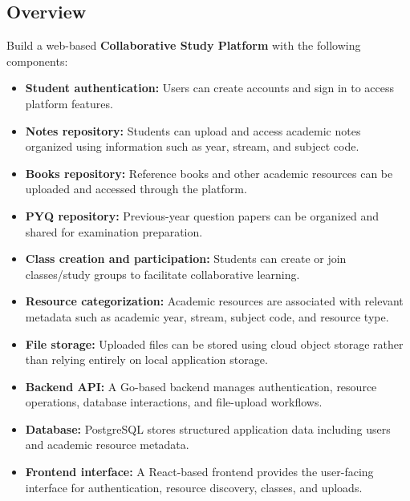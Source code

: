 \documentclass[11pt,a4paper]{article}
\begin{document}
\subsection{Overview}
Build a web-based \textbf{Collaborative Study Platform} with the following components:
\begin{itemize}[leftmargin=*]
    \item \textbf{Student authentication:} Users can create accounts and sign in to access platform features.
    \item \textbf{Notes repository:} Students can upload and access academic notes organized using information such as year, stream, and subject code.
    \item \textbf{Books repository:} Reference books and other academic resources can be uploaded and accessed through the platform.
    \item \textbf{PYQ repository:} Previous-year question papers can be organized and shared for examination preparation.
    \item \textbf{Class creation and participation:} Students can create or join classes/study groups to facilitate collaborative learning.
    \item \textbf{Resource categorization:} Academic resources are associated with relevant metadata such as academic year, stream, subject code, and resource type.
    \item \textbf{File storage:} Uploaded files can be stored using cloud object storage rather than relying entirely on local application storage.
    \item \textbf{Backend API:} A Go-based backend manages authentication, resource operations, database interactions, and file-upload workflows.
    \item \textbf{Database:} PostgreSQL stores structured application data including users and academic resource metadata.
    \item \textbf{Frontend interface:} A React-based frontend provides the user-facing interface for authentication, resource discovery, classes, and uploads.
\end{itemize}
\end{document}
